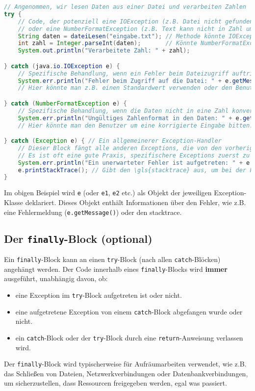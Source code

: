 \begin{lstlisting}[language=Java, caption={Beispiel für catch-Blöcke}, label=lst:catchblock_beispiel_java]
// Angenommen, wir lesen Daten aus einer Datei und verarbeiten Zahlen
try {
    // Code, der potenziell eine IOException (z.B. Datei nicht gefunden)
    // oder eine NumberFormatException (z.B. Text kann nicht in Zahl umgewandelt werden) auslösen könnte.
    String daten = dateiLesen("eingabe.txt"); // Methode könnte IOException werfen
    int zahl = Integer.parseInt(daten);       // Könnte NumberFormatException werfen
    System.out.println("Verarbeitete Zahl: " + zahl);

} catch (java.io.IOException e) {
    // Spezifische Behandlung, wenn ein Fehler beim Dateizugriff auftritt
    System.err.println("Fehler beim Zugriff auf die Datei: " + e.getMessage());
    // Hier könnte man z.B. einen Standardwert verwenden oder den Benutzer informieren.

} catch (NumberFormatException e) {
    // Spezifische Behandlung, wenn die Daten nicht in eine Zahl konvertiert werden können
    System.err.println("Ungültiges Zahlenformat in den Daten: " + e.getMessage());
    // Hier könnte man den Benutzer um eine korrigierte Eingabe bitten.

} catch (Exception e) { // Ein allgemeinerer Exception-Handler
    // Dieser Block fängt alle anderen Exceptions, die von den vorherigen catch-Blöcken nicht abgefangen wurden.
    // Es ist oft eine gute Praxis, spezifischere Exceptions zuerst zu fangen.
    System.err.println("Ein unerwarteter Fehler ist aufgetreten: " + e.getMessage());
    e.printStackTrace(); // Gibt den \gls{stacktrace} aus, um bei der Fehlersuche zu helfen.
}
\end{lstlisting}
Im obigen Beispiel wird \texttt{e} (oder \texttt{e1}, \texttt{e2} etc.) als
Objekt der jeweiligen Exception-Klasse deklariert. Dieses Objekt enthält
Informationen über den Fehler, wie z.B. eine Fehlermeldung
(\texttt{e.getMessage()}) oder den \gls{stacktrace}.

\subsection{Der \texttt{finally}-Block (optional)}

Ein \texttt{finally}-Block kann an einen \texttt{try}-Block (nach allen
\texttt{catch}-Blöcken) angehängt werden. Der Code innerhalb eines
\texttt{finally}-Blocks wird \textbf{immer} ausgeführt, unabhängig davon, ob:
\begin{itemize}
    \item eine Exception im \texttt{try}-Block aufgetreten ist oder nicht.
    \item eine aufgetretene Exception von einem \texttt{catch}-Block abgefangen wurde
          oder nicht.
    \item ein \texttt{catch}-Block oder der \texttt{try}-Block durch eine
          \texttt{return}-Anweisung verlassen wird.
\end{itemize}
Der \texttt{finally}-Block wird typischerweise für Aufräumarbeiten verwendet, wie z.B. das Schließen von Dateien, Netzwerkverbindungen oder Datenbankverbindungen, um sicherzustellen, dass Ressourcen freigegeben werden, egal was passiert.


